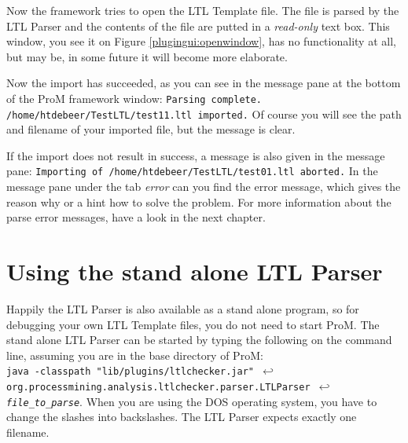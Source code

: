Now the framework tries to open the LTL Template file. The file is parsed by the LTL Parser and the
contents of the file are putted in a \textit{read-only} text box. This
window, you see it on Figure \ref{plugingui:openwindow}, has no functionality
at all, but may be, in some future it will become more elaborate. 

Now the import has succeeded, as you can see in the message pane at the bottom
of the ProM framework window:
\texttt{Parsing complete. /home/\-htdebeer/\-TestLTL/\-test11.ltl imported.}
Of course you will see the path and filename of your imported file, but the
message is clear.

If the import does not result in success, a message is also given in the
message pane: \texttt{Importing of /home/\-htdebeer/\-TestLTL/\-test01.ltl aborted.}
In the message pane under the tab \textit{error} can you find the error
message, which gives the reason why or a hint how to solve the problem. For
more information about the parse error messages, have a look in the next
chapter.

\section{Using the stand alone LTL Parser}
\label{plugingui:parser}

Happily the LTL Parser is also available as a stand alone program, so
for debugging your own LTL Template files, you do not need to start ProM. The
stand alone LTL Parser can be started by typing the following on the command
line, assuming you are in the base directory of ProM:\\

\texttt{java -classpath "lib/plugins/ltlchecker.jar" $\hookleftarrow$\\
org.processmining.analysis.ltlchecker.parser.LTLParser $\hookleftarrow$\\
\textit{file\_to\_parse}}. When you are using the DOS operating system, you
have to change the slashes into backslashes. The LTL Parser expects exactly
one filename.

